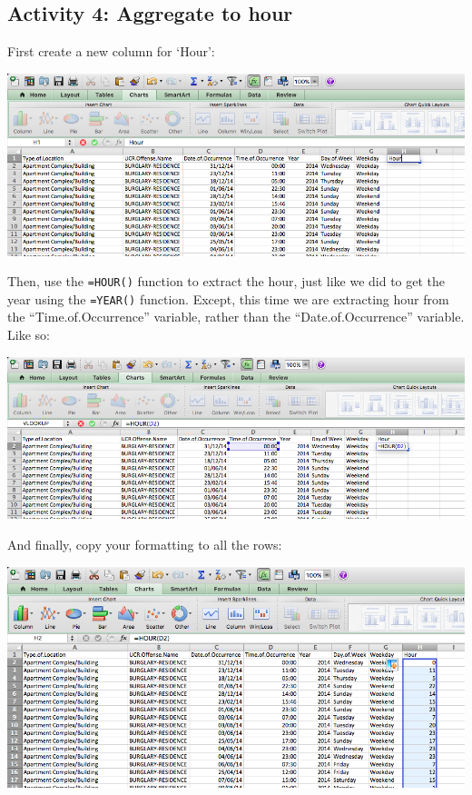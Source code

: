 \documentclass[]{book}
\theoremstyle{definition}
\theoremstyle{definition}
\theoremstyle{definition}
\theoremstyle{remark}
\begin{document}
\hypertarget{activity-4-aggregate-to-hour}{%
\subsection{Activity 4: Aggregate to
hour}\label{activity-4-aggregate-to-hour}}

 First create a new column for `Hour':

\includegraphics{imgs/hour_1.png}

Then, use the \texttt{=HOUR()} function to extract the hour, just like
we did to get the year using the \texttt{=YEAR()} function. Except, this
time we are extracting hour from the ``Time.of.Occurrence'' variable,
rather than the ``Date.of.Occurrence'' variable. Like so:

\includegraphics{imgs/hour_2.png}

And finally, copy your formatting to all the rows:

\includegraphics{imgs/hour_3.png}
\end{document}
